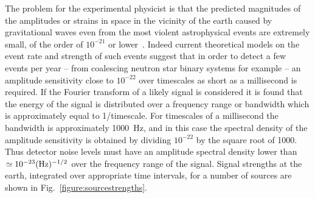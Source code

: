 \documentclass{article}
\begin{document}
The problem for the experimental physicist is that the predicted magnitudes of
the amplitudes or strains in space in the vicinity of the earth caused by
gravitational waves even from the most violent astrophysical events are
extremely small, of the order of $10^{-21}$ or lower~\cite{Sathyaprakash:2009,LISAsymposium}.
Indeed current theoretical models on the event rate and strength of such events
suggest that in order to detect a few events per year -- from coalescing neutron
star binary systems for example -- an amplitude sensitivity close to $10^{-22}$
over timescales as short as a millisecond is required. If the Fourier transform
of a likely signal is considered it is found that the energy of the signal is
distributed over a frequency range or bandwidth which is approximately equal to
1/timescale.  For timescales of a millisecond the bandwidth is approximately
1000~Hz, and in this case the spectral density of the amplitude sensitivity is
obtained by dividing $10^{-22}$ by the square root of 1000. Thus detector noise
levels must have an amplitude spectral density lower than $\simeq 10^{-23}(\rm
Hz)^{-1/2}$ over the frequency range of the signal. Signal strengths at the
earth, integrated over appropriate time intervals, for a number of sources are
shown in Fig.~\ref{figure:sourcestrengths}.

\end{document}
